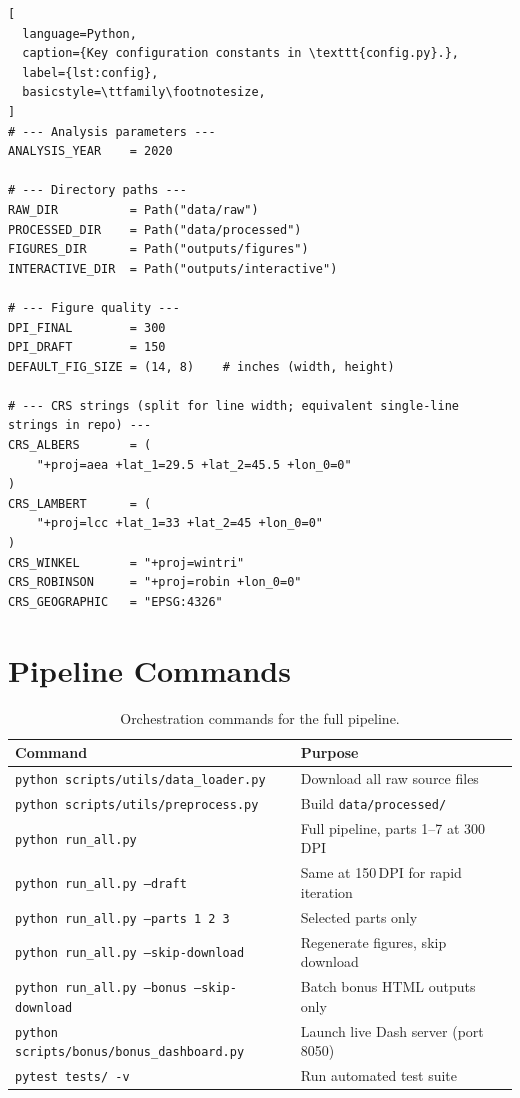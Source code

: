 \documentclass[12pt, a4paper, oneside]{report}
\newcommand{\ts}{\renewcommand{\arraystretch}{1.35}}
\begin{document}
\begin{lstlisting}[
  language=Python,
  caption={Key configuration constants in \texttt{config.py}.},
  label={lst:config},
  basicstyle=\ttfamily\footnotesize,
]
# --- Analysis parameters ---
ANALYSIS_YEAR    = 2020

# --- Directory paths ---
RAW_DIR          = Path("data/raw")
PROCESSED_DIR    = Path("data/processed")
FIGURES_DIR      = Path("outputs/figures")
INTERACTIVE_DIR  = Path("outputs/interactive")

# --- Figure quality ---
DPI_FINAL        = 300
DPI_DRAFT        = 150
DEFAULT_FIG_SIZE = (14, 8)    # inches (width, height)

# --- CRS strings (split for line width; equivalent single-line strings in repo) ---
CRS_ALBERS       = (
    "+proj=aea +lat_1=29.5 +lat_2=45.5 +lon_0=0"
)
CRS_LAMBERT      = (
    "+proj=lcc +lat_1=33 +lat_2=45 +lon_0=0"
)
CRS_WINKEL       = "+proj=wintri"
CRS_ROBINSON     = "+proj=robin +lon_0=0"
CRS_GEOGRAPHIC   = "EPSG:4326"
\end{lstlisting}

\section{Pipeline Commands}

\footnotesize
\ts
\begin{table}[H]
  \centering
  \caption{Orchestration commands for the full pipeline.}
  \label{tab:commands}
  \begin{tabularx}{\textwidth}{@{} >{\ttfamily\raggedright\arraybackslash}p{} Z @{}}
    \toprule
    \textbf{Command} & \textbf{Purpose} \\
    \midrule
    \texttt{python scripts/utils/data\_loader.py}
      & Download all raw source files \\
    \texttt{python scripts/utils/preprocess.py}
      & Build \texttt{data/processed/} \\
    \texttt{python run\_all.py}
      & Full pipeline, parts 1--7 at 300\,DPI \\
    \texttt{python run\_all.py --draft}
      & Same at 150\,DPI for rapid iteration \\
    \texttt{python run\_all.py --parts 1 2 3}
      & Selected parts only \\
    \texttt{python run\_all.py --skip-download}
      & Regenerate figures, skip download \\
    \texttt{python run\_all.py --bonus --skip-download}
      & Batch bonus HTML outputs only \\
    \texttt{python scripts/bonus/bonus\_dashboard.py}
      & Launch live Dash server (port 8050) \\
    \texttt{pytest tests/ -v}
      & Run automated test suite \\
    \bottomrule
  \end{tabularx}
\end{table}
\normalsize
\end{document}
